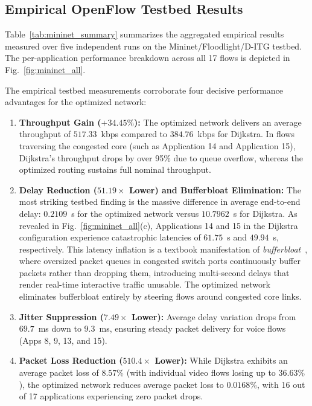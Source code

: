 \documentclass[journal]{IEEEtran}
\begin{document}
\subsection{Empirical OpenFlow Testbed Results}
Table~\ref{tab:mininet_summary} summarizes the aggregated empirical results measured over five independent runs on the Mininet/Floodlight/D-ITG testbed. The per-application performance breakdown across all 17 flows is depicted in Fig.~\ref{fig:mininet_all}.

The empirical testbed measurements corroborate four decisive performance advantages for the optimized network:
\begin{enumerate}
    \item \textbf{Throughput Gain ($+34.45\%$):} The optimized network delivers an average throughput of $517.33$~kbps compared to $384.76$~kbps for Dijkstra. In flows traversing the congested core (such as Application 14 and Application 15), Dijkstra's throughput drops by over 95\% due to queue overflow, whereas the optimized routing sustains full nominal throughput.
    \item \textbf{Delay Reduction ($51.19\times$ Lower) and Bufferbloat Elimination:} The most striking testbed finding is the massive difference in average end-to-end delay: $0.2109$~s for the optimized network versus $10.7962$~s for Dijkstra. As revealed in Fig.~\ref{fig:mininet_all}(c), Applications 14 and 15 in the Dijkstra configuration experience catastrophic latencies of $61.75$~s and $49.94$~s, respectively. This latency inflation is a textbook manifestation of \emph{bufferbloat}~\cite{gettys2011bufferbloat}, where oversized packet queues in congested switch ports continuously buffer packets rather than dropping them, introducing multi-second delays that render real-time interactive traffic unusable. The optimized network eliminates bufferbloat entirely by steering flows around congested core links.
    \item \textbf{Jitter Suppression ($7.49\times$ Lower):} Average delay variation drops from $69.7$~ms down to $9.3$~ms, ensuring steady packet delivery for voice flows (Apps 8, 9, 13, and 15).
    \item \textbf{Packet Loss Reduction ($510.4\times$ Lower):} While Dijkstra exhibits an average packet loss of $8.57\%$ (with individual video flows losing up to $36.63\%$), the optimized network reduces average packet loss to $0.0168\%$, with 16 out of 17 applications experiencing zero packet drops.
\end{enumerate}
\end{document}
